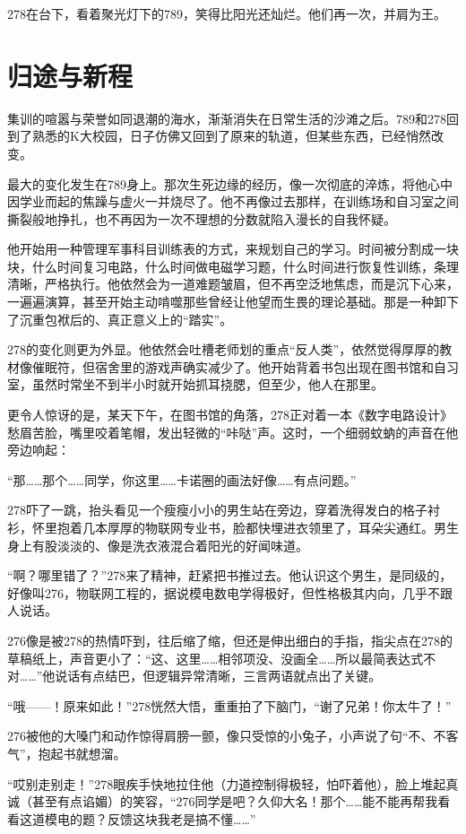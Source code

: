 \documentclass[a4paper]{book}
\begin{document}
278在台下，看着聚光灯下的789，笑得比阳光还灿烂。他们再一次，并肩为王。
\normalsize
\section{归途与新程}
\songti{}
集训的喧嚣与荣誉如同退潮的海水，渐渐消失在日常生活的沙滩之后。789和278回到了熟悉的K大校园，日子仿佛又回到了原来的轨道，但某些东西，已经悄然改变。

最大的变化发生在789身上。那次生死边缘的经历，像一次彻底的淬炼，将他心中因学业而起的焦躁与虚火一并烧尽了。他不再像过去那样，在训练场和自习室之间撕裂般地挣扎，也不再因为一次不理想的分数就陷入漫长的自我怀疑。

他开始用一种管理军事科目训练表的方式，来规划自己的学习。时间被分割成一块块，什么时间复习电路，什么时间做电磁学习题，什么时间进行恢复性训练，条理清晰，严格执行。他依然会为一道难题皱眉，但不再空泛地焦虑，而是沉下心来，一遍遍演算，甚至开始主动啃噬那些曾经让他望而生畏的理论基础。那是一种卸下了沉重包袱后的、真正意义上的“踏实”。

278的变化则更为外显。他依然会吐槽老师划的重点“反人类”，依然觉得厚厚的教材像催眠符，但宿舍里的游戏声确实减少了。他开始背着书包出现在图书馆和自习室，虽然时常坐不到半小时就开始抓耳挠腮，但至少，他人在那里。

更令人惊讶的是，某天下午，在图书馆的角落，278正对着一本《数字电路设计》愁眉苦脸，嘴里咬着笔帽，发出轻微的“咔哒”声。这时，一个细弱蚊蚋的声音在他旁边响起：

“那……那个……同学，你这里……卡诺圈的画法好像……有点问题。”

278吓了一跳，抬头看见一个瘦瘦小小的男生站在旁边，穿着洗得发白的格子衬衫，怀里抱着几本厚厚的物联网专业书，脸都快埋进衣领里了，耳朵尖通红。男生身上有股淡淡的、像是洗衣液混合着阳光的好闻味道。

“啊？哪里错了？”278来了精神，赶紧把书推过去。他认识这个男生，是同级的，好像叫276，物联网工程的，据说模电数电学得极好，但性格极其内向，几乎不跟人说话。

276像是被278的热情吓到，往后缩了缩，但还是伸出细白的手指，指尖点在278的草稿纸上，声音更小了：“这、这里……相邻项没、没画全……所以最简表达式不对……”他说话有点结巴，但逻辑异常清晰，三言两语就点出了关键。

“哦——！原来如此！”278恍然大悟，重重拍了下脑门，“谢了兄弟！你太牛了！”

276被他的大嗓门和动作惊得肩膀一颤，像只受惊的小兔子，小声说了句“不、不客气”，抱起书就想溜。

“哎别走别走！”278眼疾手快地拉住他（力道控制得极轻，怕吓着他），脸上堆起真诚（甚至有点谄媚）的笑容，“276同学是吧？久仰大名！那个……能不能再帮我看看这道模电的题？反馈这块我老是搞不懂……”
\end{document}
